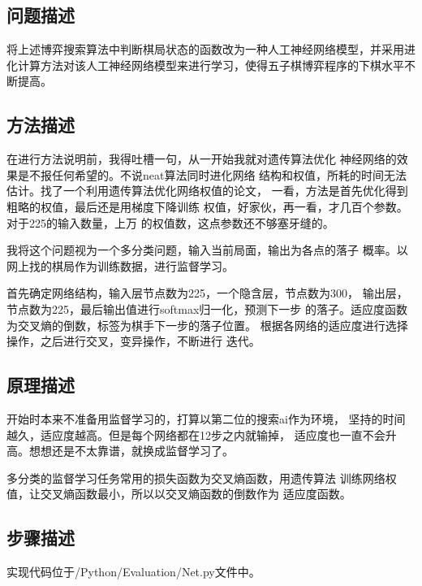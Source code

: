 \documentclass[UTF8]{article}
\begin{document}
\subsection{问题描述}
将上述博弈搜索算法中判断棋局状态的函数改为一种人工神经网络模型，并采用进
化计算方法对该人工神经网络模型来进行学习，使得五子棋博弈程序的下棋水平不断提高。
\subsection{方法描述}

在进行方法说明前，我得吐槽一句，从一开始我就对遗传算法优化
神经网络的效果是不报任何希望的。不说neat算法同时进化网络
结构和权值，所耗的时间无法估计。找了一个利用遗传算法优化网络权值的论文，
一看，方法是首先优化得到粗略的权值，最后还是用梯度下降训练
权值，好家伙，再一看，才几百个参数。对于225的输入数量，上万
的权值数，这点参数还不够塞牙缝的。

我将这个问题视为一个多分类问题，输入当前局面，输出为各点的落子
概率。以网上找的棋局作为训练数据，进行监督学习。

首先确定网络结构，输入层节点数为225，一个隐含层，节点数为300，
输出层，节点数为225，最后输出值进行softmax归一化，预测下一步
的落子。适应度函数为交叉熵的倒数，标签为棋手下一步的落子位置。
根据各网络的适应度进行选择操作，之后进行交叉，变异操作，不断进行
迭代。

\subsection{原理描述}

开始时本来不准备用监督学习的，打算以第二位的搜索ai作为环境，
坚持的时间越久，适应度越高。但是每个网络都在12步之内就输掉，
适应度也一直不会升高。想想还是不太靠谱，就换成监督学习了。

多分类的监督学习任务常用的损失函数为交叉熵函数，用遗传算法
训练网络权值，让交叉熵函数最小，所以以交叉熵函数的倒数作为
适应度函数。

\subsection{步骤描述}

实现代码位于/Python/Evaluation/Net.py文件中。
\end{document}
